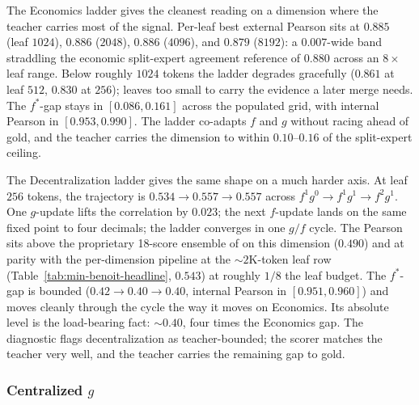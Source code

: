 The Economics ladder gives the cleanest reading on a dimension where
the teacher carries most of the signal. Per-leaf best external Pearson
sits at $0.885$ (leaf $1024$), $0.886$ ($2048$), $0.886$ ($4096$), and
$0.879$ ($8192$): a $0.007$-wide band straddling the economic
split-expert agreement reference of $0.880$ across an $8\times$ leaf
range. Below roughly $1024$ tokens the ladder degrades gracefully
($0.861$ at leaf $512$, $0.830$ at $256$); leaves too small to carry
the evidence a later merge needs. The $f^*$-gap stays in
$[0.086, 0.161]$ across the populated grid, with internal Pearson in
$[0.953, 0.990]$. The ladder co-adapts $f$ and $g$ without racing
ahead of gold, and the teacher carries the dimension to within
$0.10$--$0.16$ of the split-expert ceiling.

The Decentralization ladder gives the same shape on a much harder
axis. At leaf $256$ tokens, the trajectory is
$0.534 \to 0.557 \to 0.557$ across $f^1g^0 \to f^1g^1 \to f^2g^1$. One
$g$-update lifts the correlation by $0.023$; the next $f$-update lands
on the same fixed point to four decimals; the ladder converges in one
$g/f$ cycle. The Pearson sits above the proprietary 18-score ensemble
of \citet{BenoitEtAl2025} on this dimension ($0.490$) and at parity
with the per-dimension pipeline at the $\sim\!2\mathrm{K}$-token leaf
row (Table~\ref{tab:min-benoit-headline}, $0.543$) at roughly $1/8$
the leaf budget. The $f^*$-gap is bounded ($0.42 \to 0.40 \to 0.40$,
internal Pearson in $[0.951, 0.960]$) and moves cleanly through the
cycle the way it moves on Economics. Its absolute level is the
load-bearing fact: $\sim\!0.40$, four times the Economics gap. The
diagnostic flags decentralization as teacher-bounded; the scorer
matches the teacher very well, and the teacher carries the remaining
gap to gold.%

\subsubsection*{Centralized $g$}\label{sec:min-fg-centralized}



